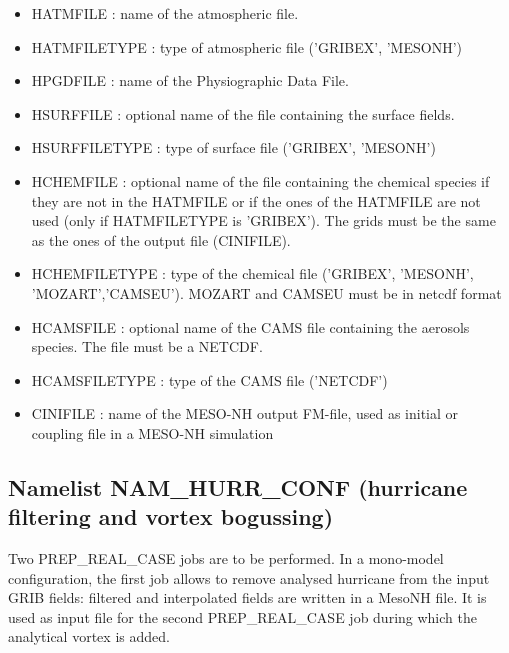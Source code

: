 \begin{itemize}
\item HATMFILE : name of the atmospheric file.
\item HATMFILETYPE : type of  atmospheric file ('GRIBEX', 'MESONH')
\item HPGDFILE : name of the Physiographic Data File.
\item HSURFFILE : optional name of the file containing the surface fields.
\item HSURFFILETYPE : type of surface file ('GRIBEX', 'MESONH')
\item HCHEMFILE : optional name of the file containing
the chemical species if they are not in the HATMFILE or if the ones of the
HATMFILE are not used (only if HATMFILETYPE is 'GRIBEX'). The grids must
be the same as the ones of the output file (CINIFILE).
\item HCHEMFILETYPE : type of the chemical file ('GRIBEX', 'MESONH', 'MOZART','CAMSEU'). MOZART and CAMSEU must be in netcdf format
\item HCAMSFILE : optional name of the CAMS file containing
the aerosols species. The file must be a NETCDF.
\item HCAMSFILETYPE : type of the CAMS file ('NETCDF')

\item CINIFILE : name of the MESO-NH output FM-file, used as initial
or coupling file in a MESO-NH simulation
\end{itemize}
\subsection{Namelist NAM\_HURR\_CONF (hurricane filtering and vortex bogussing)}
Two PREP\_REAL\_CASE jobs are to be performed.
In a mono-model configuration, the
first job allows to remove analysed hurricane from the input GRIB fields:
filtered and interpolated fields are written in a MesoNH file.
It is used as input file for the second
PREP\_REAL\_CASE job during which the analytical vortex is added.\\

